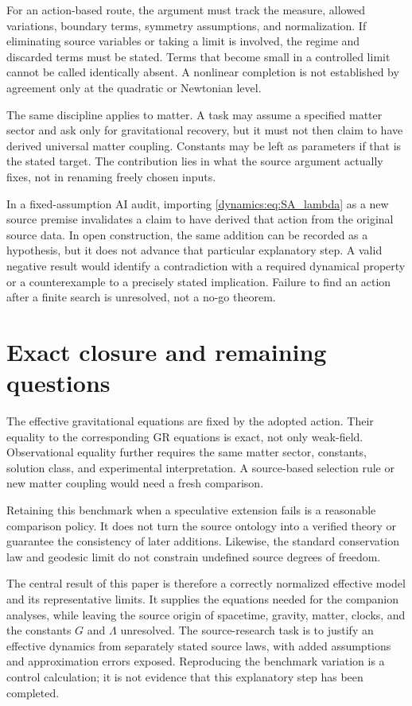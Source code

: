 \documentclass[11pt,oneside]{report}
\theoremstyle{remark}
\numberwithin{definition}{chapter}
\numberwithin{proposition}{chapter}
\numberwithin{remark}{chapter}
\begin{document}
For an action-based route, the argument must track the measure, allowed variations, boundary terms, symmetry assumptions, and normalization. If eliminating source variables or taking a limit is involved, the regime and discarded terms must be stated. Terms that become small in a controlled limit cannot be called identically absent. A nonlinear completion is not established by agreement only at the quadratic or Newtonian level.

The same discipline applies to matter. A task may assume a specified matter sector and ask only for gravitational recovery, but it must not then claim to have derived universal matter coupling. Constants may be left as parameters if that is the stated target. The contribution lies in what the source argument actually fixes, not in renaming freely chosen inputs.

In a fixed-assumption AI audit, importing \eqref{dynamics:eq:SA_lambda} as a new source premise invalidates a claim to have derived that action from the original source data. In open construction, the same addition can be recorded as a hypothesis, but it does not advance that particular explanatory step. A valid negative result would identify a contradiction with a required dynamical property or a counterexample to a precisely stated implication. Failure to find an action after a finite search is unresolved, not a no-go theorem.

\section{Exact closure and remaining questions}
The effective gravitational equations are fixed by the adopted action. Their equality to the corresponding GR equations is exact, not only weak-field. Observational equality further requires the same matter sector, constants, solution class, and experimental interpretation. A source-based selection rule or new matter coupling would need a fresh comparison.

Retaining this benchmark when a speculative extension fails is a reasonable comparison policy. It does not turn the source ontology into a verified theory or guarantee the consistency of later additions. Likewise, the standard conservation law and geodesic limit do not constrain undefined source degrees of freedom.

The central result of this paper is therefore a correctly normalized effective model and its representative limits. It supplies the equations needed for the companion analyses, while leaving the source origin of spacetime, gravity, matter, clocks, and the constants $G$ and $\Lambda$ unresolved.
The source-research task is to justify an effective dynamics from separately stated source laws, with added assumptions and approximation errors exposed. Reproducing the benchmark variation is a control calculation; it is not evidence that this explanatory step has been completed.
\end{document}
